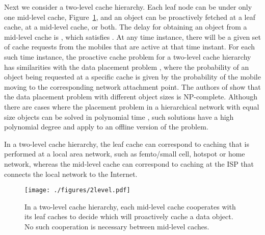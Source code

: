 \documentclass[conference]{IEEEtran}
\newcommand{\mynotex}[1]{}
\begin{document}
Next we consider a two-level cache hierarchy. Each leaf node can be under only one mid-level cache, Figure~\ref{fig:2level}, and  an object can be proactively fetched at a leaf cache, at a mid-level cache, or both.
The delay for obtaining an object from a mid-level cache is , which satisfies .
At any time instance, there will be a given set of cache requests from the  mobiles that are active at that time instant. For each such time instance, the proactive cache problem for a two-level cache hierarchy has similarities with the data placement problem \cite{Bae+08}, where the probability of an object being requested at a specific cache is given by the probability of the mobile moving to the corresponding network attachment point. The authors of  \cite{Bae+08} show that the data placement problem with different object sizes is NP-complete. Although there are cases where the placement problem in a hierarchical network with equal size objects can be solved in polynomial time \cite{Kor+01}, such solutions have a high polynomial degree  and apply to an offline version of the problem.



In  a two-level cache hierarchy, the leaf cache can correspond to caching that is performed at a local area network, such as femto/small cell, hotspot or home network, whereas the mid-level cache can correspond to caching at the ISP that connects the local network to the Internet.

\begin{figure}[b]
\vspace{-0.15in}
\centering
\texttt{[image: ./figures/2level.pdf]}
\caption{In a two-level cache hierarchy, each mid-level cache cooperates with its leaf caches to decide which  will proactively cache a data object. No such cooperation is necessary between mid-level caches.}
\label{fig:2level}
\end{figure}

\mynotex{ADD MORE DETAILS in figure caption}
\end{document}
